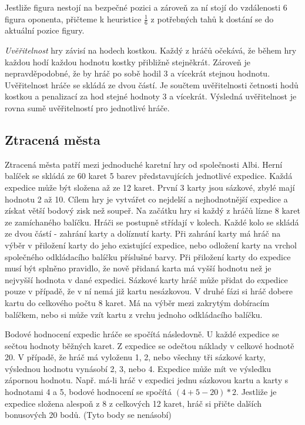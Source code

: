 Jestliže figura nestojí na bezpečné pozici a zároveň za ní stojí do vzdálenosti 6 figura oponenta, přičteme k heuristice $\frac{1}{6}$ z potřebných tahů k dostání se do aktuální pozice figury.

\emph{Uvěřitelnost} hry závisí na hodech kostkou. Každý z hráčů očekává, že během hry každou hodí každou hodnotu kostky přibližně stejněkrát. Zároveň je nepravděpodobné, že by hráč po sobě hodil 3 a vícekrát stejnou hodnotu. Uvěřitelnost hráče se skládá ze dvou částí. Je součtem uvěřitelnosti četnosti hodů kostkou a penalizací za hod stejné hodnoty 3 a vícekrát. Výsledná uvěřitelnost je rovna sumě uvěřitelností pro jednotlivé hráče.

\subsection{Ztracená města}

Ztracená města patří mezi jednoduché karetní hry od společnosti Albi. Herní balíček se skládá ze 60 karet 5 barev představujících jednotlivé expedice. Každá expedice může být složena až ze 12 karet. První 3 karty jsou sázkové, zbylé mají hodnotu 2 až 10. Cílem hry je vytvářet co nejdelší a nejhodnotnější expedice a získat větší bodový zisk než soupeř. Na začátku hry si každý z hráčů lízne 8 karet ze zamíchaného balíčku. Hráči se postupně střídají v kolech. Každé kolo se skládá ze dvou částí - zahrání karty a dolíznutí karty. Při zahrání karty má hráč na výběr v přiložení karty do jeho existující expedice, nebo odložení karty na vrchol společného odkládacího balíčku příslušné barvy. Při přiložení karty do expedice musí být splněno pravidlo, že nově přidaná karta má vyšší hodnotu než je nejvyšší hodnota v dané expedici. Sázkové karty hráč může přidat do expedice pouze v případě, že v ní nemá již kartu nesázkovou. V druhé fázi si hráč dobere kartu do celkového počtu 8 karet. Má na výběr mezi zakrytým dobíracím balíčkem, nebo si může vzít kartu z vrchu jednoho odkládacího balíčku.

Bodové hodnocení expedic hráče se spočítá následovně. U každé expedice se sečtou hodnoty běžných karet. Z expedice se odečtou náklady v celkové hodnotě 20. V případě, že hráč má vyloženu 1, 2, nebo všechny tři sázkové karty, výslednou hodnotu vynásobí 2, 3, nebo 4. Expedice může mít ve výsledku zápornou hodnotu. Např. má-li hráč v expedici jednu sázkovou kartu a karty s hodnotami 4 a 5, bodové hodnocení se spočítá $(4 + 5 - 20) * 2$. Jestliže je expedice složena alespoň z 8 z celkových 12 karet, hráč si přičte dalších bonusových 20 bodů. (Tyto body se nenásobí)

